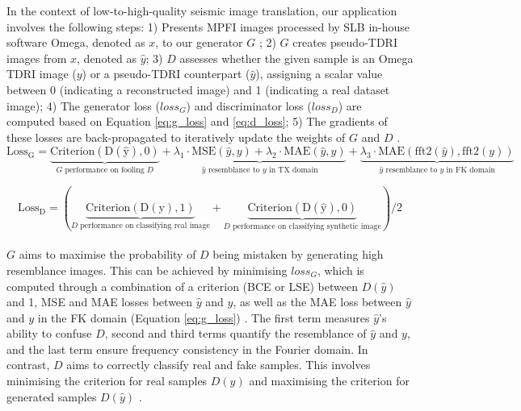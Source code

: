 \noindent In the context of low-to-high-quality seismic image translation, our application involves the following steps: 1) Presents MPFI images processed by SLB in-house software Omega, denoted as $x$, to our generator $G$ ; 2) $G$ creates pseudo-TDRI images from $x$, denoted as $\hat{y}$; 3) $D$ assesses whether the given sample is an Omega TDRI image ($y$) or a pseudo-TDRI counterpart ($\hat{y}$), assigning a scalar value between 0 (indicating a reconstructed image) and 1 (indicating a real dataset image); 4) The generator loss ($loss_{G}$) and discriminator loss ($loss_{D}$) are computed based on Equation \ref{eq:g_loss} and \ref{eq:d_loss}; 5) The gradients of these losses are back-propagated to iteratively update the weights of $G$ and $D$ \cite{saxena2021generative}.
\\
\begin{equation}
	\mathrm{Loss_{G}}= \underbrace{\mathrm{Criterion(D(\hat{y}),0)}}_{\text{$G$ performance on fooling $D$}} + \underbrace{\lambda_1 \cdot \mathrm{MSE}(\hat{y}, y) + \lambda_2 \cdot \mathrm{MAE}(\hat{y}, y)}_{\text{$\hat{y}$ resemblance to $y$ in TX domain}} + \underbrace{\lambda_3 \cdot \mathrm{MAE}(\text{fft2}(\hat{y}), \text{fft2}(y))}_{\text{$\hat{y}$ resemblance to $y$ in FK domain}}
	\label{eq:g_loss}
\end{equation}

\begin{equation}
	\mathrm{Loss_{D}}=(\underbrace{\mathrm{Criterion(D(y),1)}}_\text{$D$ performance on classifying real image} + \underbrace{\mathrm{Criterion(D(\hat{y}),0)}}_\text{$D$ performance on classifying synthetic image})/2
	\label{eq:d_loss}
\end{equation}
\\

\noindent $G$ aims to maximise the probability of $D$ being mistaken by generating high resemblance images. This can be achieved by minimising $loss_{G}$, which is computed through a combination of a criterion (BCE or LSE) between $D(\hat{y})$ and 1, MSE and MAE losses between $\hat{y}$ and $y$, as well as the MAE loss between $\hat{y}$ and $y$ in the FK domain (Equation \ref{eq:g_loss}) \cite{kumar2022deep}. The first term measures $\hat{y}$'s ability to confuse $D$, second and third terms quantify the resemblance of $\hat{y}$ and $y$, and the last term ensure frequency consistency in the Fourier domain. In contrast, $D$ aims to correctly classify real and fake samples. This involves minimising the criterion for real samples $D(y)$ and maximising the criterion for generated samples $D(\hat{y})$ \cite{kumar2022deep}.


